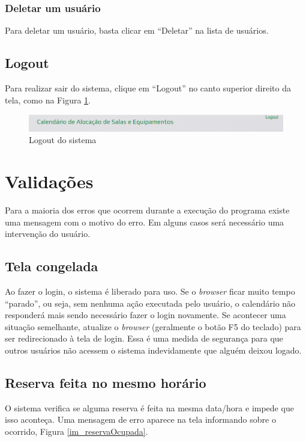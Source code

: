 \documentclass[openany,10pt,a4paper]{book}
\begin{document}
\subsection{Deletar um usuário}
Para deletar um usuário, basta clicar em ``Deletar'' na lista de usuários.

\section{Logout}
Para realizar sair do sistema, clique em ``Logout'' no canto superior direito da tela, como na Figura \ref{logout}.

\begin{figure}[!htb]
    \centering
    \includegraphics[scale=0.5]{logout.png}
    \caption{Logout do sistema}
    \label{logout}
\end{figure}

\chapter{Validações}

Para a maioria dos erros que ocorrem durante a execução do programa existe uma mensagem com o motivo do erro. Em alguns casos será necessário uma intervenção do usuário.

\section{Tela congelada}
Ao fazer o login, o sistema é liberado para uso. Se o \textit{browser} ficar muito tempo ``parado'', ou seja, sem nenhuma ação executada pelo usuário, o calendário não responderá mais sendo necessário fazer o login novamente. Se acontecer uma situação semelhante, atualize o \textit{browser} (geralmente o botão F5 do teclado) para ser redirecionado à tela de login.
Essa é uma medida de segurança para que outros usuários não acessem o sistema indevidamente que alguém deixou logado.

\section{Reserva feita no mesmo horário}
O sistema verifica se alguma reserva é feita na mesma data/hora e impede que isso aconteça. Uma mensagem de erro aparece na tela informando sobre o ocorrido, Figura \ref{im_reservaOcupada}. 
\end{document}
